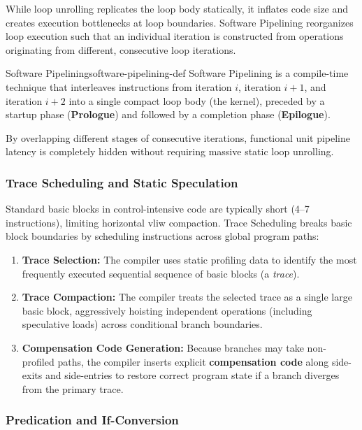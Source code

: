 While loop unrolling replicates the loop body statically, it inflates code size and creates execution bottlenecks at loop boundaries. Software Pipelining reorganizes loop execution such that an individual iteration is constructed from operations originating from different, consecutive loop iterations.

\begin{definition}{Software Pipelining}{software-pipelining-def}
    Software Pipelining is a compile-time technique that interleaves instructions from iteration $i$, iteration $i+1$, and iteration $i+2$ into a single compact loop body (the kernel), preceded by a startup phase (\textbf{Prologue}) and followed by a completion phase (\textbf{Epilogue}).
\end{definition}

By overlapping different stages of consecutive iterations, functional unit pipeline latency is completely hidden without requiring massive static loop unrolling.

\subsubsection{Trace Scheduling and Static Speculation}

Standard basic blocks in control-intensive code are typically short (4–7 instructions), limiting horizontal \gls{vliw} compaction. Trace Scheduling breaks basic block boundaries by scheduling instructions across global program paths:

\begin{enumerate}
    \item \textbf{Trace Selection:} The compiler uses static profiling data to identify the most frequently executed sequential sequence of basic blocks (a \textit{trace}).
    \item \textbf{Trace Compaction:} The compiler treats the selected trace as a single large basic block, aggressively hoisting independent operations (including speculative loads) across conditional branch boundaries.
    \item \textbf{Compensation Code Generation:} Because branches may take non-profiled paths, the compiler inserts explicit \textbf{compensation code} along side-exits and side-entries to restore correct program state if a branch diverges from the primary trace.
\end{enumerate}

\subsubsection{Predication and If-Conversion}


